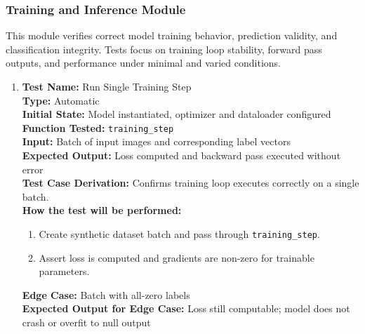 \documentclass[12pt, titlepage]{article}
\begin{document}
\subsubsection{Training and Inference Module}
This module verifies correct model training behavior, prediction validity, and classification integrity. Tests focus on training loop stability, forward pass outputs, and performance under minimal and varied conditions.

\begin{enumerate}
  \item \textbf{Test Name:} Run Single Training Step\\
  \textbf{Type:} Automatic\\
  \textbf{Initial State:} Model instantiated, optimizer and dataloader configured\\
  \textbf{Function Tested:} \verb|training_step|\\
  \textbf{Input:} Batch of input images and corresponding label vectors\\
  \textbf{Expected Output:} Loss computed and backward pass executed without error\\
  \textbf{Test Case Derivation:} Confirms training loop executes correctly on a single batch.\\
  \textbf{How the test will be performed:}
  \begin{enumerate}
    \item Create synthetic dataset batch and pass through \verb|training_step|.
    \item Assert loss is computed and gradients are non-zero for trainable parameters.
  \end{enumerate}
  \textbf{Edge Case:} Batch with all-zero labels\\
  \textbf{Expected Output for Edge Case:} Loss still computable; model does not crash or overfit to null output\\
  \vspace{1em}


\end{enumerate}
\end{document}
